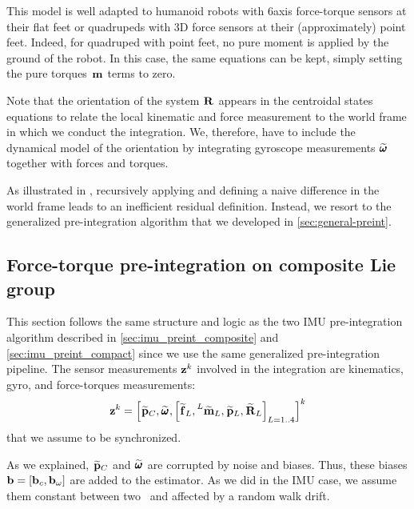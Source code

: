 This model is well adapted to humanoid robots with 6axis force-torque sensors at their flat feet or quadrupeds with 3D force sensors at their (approximately) 
point feet. Indeed, for quadruped with point feet, no pure moment is applied by the ground of the robot. In this case, the same equations can be kept, simply setting the
pure torques  $\prescript{}{}{\bf m}_{}$ terms to zero.

Note that the orientation of the system $\prescript{}{}{{\bf R}}_{}$ appears in the centroidal states equations to relate the local kinematic and force measurement to the world frame in
which we conduct the integration. We, therefore, have to include the dynamical model of the orientation by integrating gyroscope measurements $\prescript{}{}{\widetilde{\pmb{\omega}}}_{}$ together with forces and torques. 

As illustrated in , recursively applying  and defining a naive difference in the world frame leads to an inefficient
residual definition. Instead, we resort to the generalized pre-integration algorithm that we developed in \ref{sec:general-preint}.






\subsection{Force-torque pre-integration on composite Lie group}

This section follows the same structure and logic as the two IMU pre-integration algorithm described in \ref{sec:imu_preint_composite} and \ref{sec:imu_preint_compact} since
we use the same generalized pre-integration pipeline. 
The sensor measurements ${\bf z}^k$ involved in the integration are kinematics, gyro, and force-torques  measurements:
%
\begin{equation}
    {\bf z}^k = \left[ \prescript{}{}{\widetilde{{\bf p}}}_{C}, \prescript{}{}{\widetilde{\pmb{\omega}}}_{}, \left[\prescript{}{}{\widetilde{{\bf f}}}_{L}, \prescript{L}{}{\widetilde{\bf m}}_{L}, \prescript{}{}{\widetilde{{\bf p}}}_{L}, \prescript{}{}{\widetilde{{\bf R}}}_{L} \right]_{L=1..4}\right]^k
\end{equation}
%
that we assume to be synchronized.

As we explained, $\prescript{}{}{\widetilde{{\bf p}}}_{C}$ and $\prescript{}{}{\widetilde{\pmb{\omega}}}_{}$ are corrupted by noise and biases. Thus, these biases  ${\bf b} = [{\bf b}_c, {\bf b}_{\omega}]$ are added to the estimator.
As we did in the IMU case, we assume them constant between two \keyframes\ and affected by a random walk drift.


